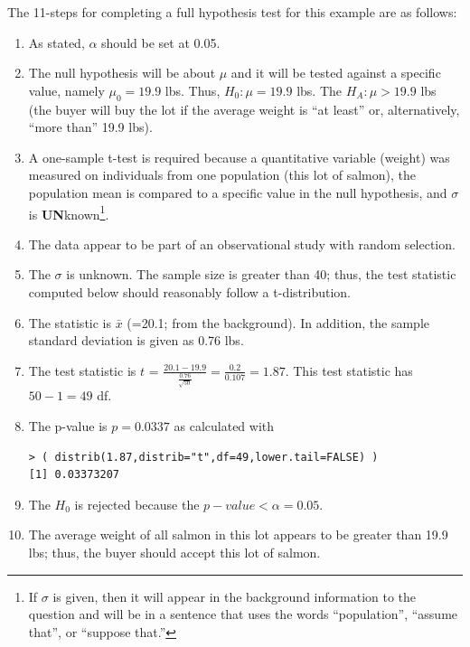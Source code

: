 \documentclass[10pt,openany]{book}\usepackage[]{graphicx}\usepackage[]{color}
\makeatletter
\newenvironment{kframe}{%
 \def\at@end@of@kframe{}%
 \ifinner\ifhmode%
  \def\at@end@of@kframe{\end{minipage}}%
  \begin{minipage}{\columnwidth}%
 \fi\fi%
 \def\FrameCommand##1{\hskip\@totalleftmargin \hskip-\fboxsep
 \colorbox{shadecolor}{##1}\hskip-\fboxsep
     \hskip-\linewidth \hskip-\@totalleftmargin \hskip\columnwidth}%
 \MakeFramed {\advance\hsize-\width
   \@totalleftmargin\z@ \linewidth\hsize
   \@setminipage}}%
 {\par\unskip\endMakeFramed%
 \at@end@of@kframe}
\newenvironment{knitrout}{}{} %
\makeatother
\begin{document}
The 11-steps  for completing a full hypothesis test for this example are as follows:
\begin{enumerate}
    \item As stated, $\alpha$ should be set at 0.05.
    \item The null hypothesis will be about $\mu$ and it will be tested against a specific value, namely $\mu_{0}=19.9$ lbs.  Thus, $H_{0}:\mu=19.9$ lbs.  The $H_{A}:\mu >19.9$ lbs (the buyer will buy the lot if the average weight is ``at least'' or, alternatively, ``more than'' 19.9 lbs).
    \item A one-sample t-test is required because a quantitative variable (weight) was measured on individuals from one population (this lot of salmon), the population mean is compared to a specific value in the null hypothesis, and $\sigma$ is \textbf{UN}known\footnote{If $\sigma$ is given, then it will appear in the background information to the question and will be in a sentence that uses the words ``population'', ``assume that'', or ``suppose that.''}.
    \item The data appear to be part of an observational study with random selection.
    \item The $\sigma$ is unknown.  The sample size is greater than 40; thus, the test statistic computed below should reasonably follow a t-distribution.
    \item The statistic is $\bar{x}$ (=20.1; from the background).  In addition, the sample standard deviation is given as 0.76 lbs.
    \item The test statistic is $t$ = $\frac{20.1-19.9}{\frac{0.76}{\sqrt{50}}} = \frac{0.2}{0.107} = 1.87$.  This test statistic has $50-1=49$ df.
    \item The p-value is $p=0.0337$ as calculated with
\begin{knitrout}
\color{fgcolor}\begin{kframe}
\begin{verbatim}
> ( distrib(1.87,distrib="t",df=49,lower.tail=FALSE) )
[1] 0.03373207
\end{verbatim}
\end{kframe}
\end{knitrout}
    \item The $H_{0}$ is rejected because the $p-value < \alpha=0.05$.
    \item The average weight of all salmon in this lot appears to be greater than 19.9 lbs; thus, the buyer should accept this lot of salmon.

\end{enumerate}
\end{document}
